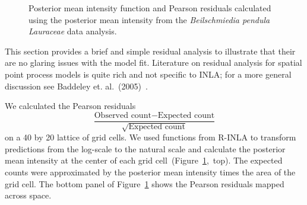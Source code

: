 \documentclass{interact}
\begin{document}
\begin{figure}[t!]\centering



\caption{Posterior mean intensity function and Pearson residuals calculated
using the posterior mean intensity from the \emph{Beilschmiedia pendula
Lauraceae} data analysis.}
\label{beiintensity}
\end{figure}

This section provides a brief and simple residual analysis to illustrate that
their are no glaring issues with the model fit. Literature on residual analysis
for spatial point process models is quite rich and not specific to INLA; for a
more general discussion see Baddeley et. al.~(2005)~\cite{baddeleyresiduals}.

We calculated the Pearson residuals
\begin{equation}
\frac{\text{Observed count} - \text{Expected count}}
{\sqrt{\text{Expected count}}}
\end{equation}
on a 40 by 20 lattice of grid cells. We used functions from R-INLA to transform
predictions from the log-scale to the natural scale and calculate the posterior
mean intensity at the center of each grid
cell~(Figure~\ref{beiintensity},~top). The expected counts were approximated by the posterior mean intensity times the area of the grid cell. The bottom panel
of Figure~\ref{beiintensity} shows the Pearson residuals mapped across space.
\end{document}
